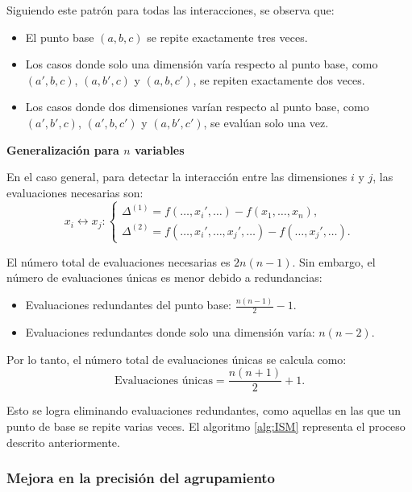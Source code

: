 \vspace{10px}

Siguiendo este patrón para todas las interacciones, se observa que:
\begin{itemize}
    \item El punto base \((a, b, c)\) se repite exactamente tres veces.
    \item Los casos donde solo una dimensión varía respecto al punto base, como \((a', b, c)\), \((a, b', c)\) y \((a, b, c')\), se repiten exactamente dos veces.
    \item Los casos donde dos dimensiones varían respecto al punto base, como \((a', b', c)\), \((a', b, c')\) y \((a, b', c')\), se evalúan solo una vez.
\end{itemize}

\vspace{20px}
\textbf{Generalización para \(n\) variables}
\vspace{10px}

En el caso general, para detectar la interacción entre las dimensiones \(i\) y \(j\), las evaluaciones necesarias son:
\[
x_i \leftrightarrow x_j : 
\begin{cases}
\Delta^{(1)} = f(\ldots, x_i', \ldots) - f(x_1, \ldots, x_n), \\
\Delta^{(2)} = f(\ldots, x_i', \ldots, x_j', \ldots) - f(\ldots, x_j', \ldots).
\end{cases}
\]

El número total de evaluaciones necesarias es \(2n(n-1)\). Sin embargo, el número de evaluaciones únicas es menor debido a redundancias:
\begin{itemize}
    \item Evaluaciones redundantes del punto base: \(\frac{n(n-1)}{2} - 1\).
    \item Evaluaciones redundantes donde solo una dimensión varía: \(n(n-2)\).
\end{itemize}

Por lo tanto, el número total de evaluaciones únicas se calcula como:
\[
\text{Evaluaciones únicas} = \frac{n(n+1)}{2} + 1.
\]

Esto se logra eliminando evaluaciones redundantes, como aquellas en las que un punto de base se repite varias veces. El algoritmo \ref{alg:ISM} representa el proceso descrito anteriormente.

\subsubsection{Mejora en la precisión del agrupamiento}

